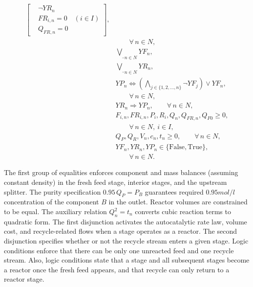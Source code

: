 \documentclass[11pt]{article}
\begin{document}
\begin{appendices}
\begin{equation}
\begin{aligned}
\left[
\begin{aligned}
& \neg YR_n\\
& FR_{i,n}=0 \quad (i\in I)\\
& Q_{FR,n}=0
\end{aligned}
\right],
\\
& \hspace{2em} \forall\, n\in N,
\\[0.6em]
& \underline{\bigvee}_{n\in N} YF_n,
\\
& \underline{\bigvee}_{n\in N} YR_n,
\\[0.4em]
& YP_n \iff
\left(
\bigwedge_{j\in\{1,2,\ldots,n\}} \neg YF_j
\right)\vee YF_n,
\\
& \hspace{2em} \forall\, n\in N,
\\
& YR_n \Longrightarrow YP_n,
\qquad \forall\, n\in N,
\\[0.4em]
& F_{i,n},FR_{i,n},P_i,R_i,Q_n,Q_{FR,n},Q_{F0}\ge 0,
\\
& \hspace{2em} \forall\, n\in N,\ i\in I,
\\
& Q_P,Q_R,V_n,c_n,t_n\ge 0,
\qquad \forall\, n\in N,
\\
& YF_n,YR_n,YP_n\in\{\mathrm{False},\mathrm{True}\},
\\
& \hspace{2em} \forall\, n\in N.
\end{aligned}
\end{equation}
\endgroup


The first group of equalities enforces component and mass balances (assuming constant density) in the fresh feed stage, interior stages, and the upstream splitter.  
The purity specification \(0.95\,Q_P=P_B\) guarantees required \(0.95 mol/l\) concentration of the component \(B\) in the outlet.  
Reactor volumes are constrained to be equal. 
The auxiliary relation \(Q_n^{2}=t_n\) converts cubic reaction terms to quadratic form.  
The first disjunction activates the autocatalytic rate law, volume cost, and recycle‐related flows when a stage operates as a reactor. 
The second disjunction specifies whether or not the recycle stream enters a given stage.  
Logic conditions enforce that there can be only one unreacted feed and one recycle stream.
Also, logic conditions state that a stage and all subsequent stages become a reactor once the fresh feed appears, and that recycle can only return to a reactor stage.  

\end{appendices}






\printbibliography
\end{document}

